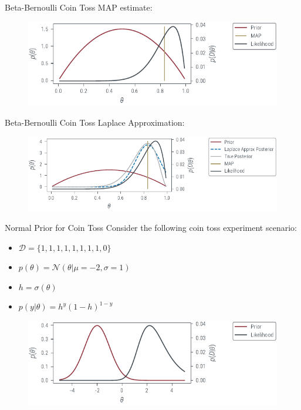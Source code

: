 \documentclass{beamer}
\begin{document}
\begin{frame}{Beta-Bernoulli Coin Toss}
    MAP estimate:
    \begin{figure}
        \includegraphics[]{../figures/laplace-approx/beta-prior-coin-toss-map.pdf}
    \end{figure}
\end{frame}

\begin{frame}{Beta-Bernoulli Coin Toss}
    Laplace Approximation:
    \begin{figure}
        \includegraphics[]{../figures/laplace-approx/beta-prior-coin-toss-laplace.pdf}
    \end{figure}
\end{frame}

\begin{frame}{Normal Prior for Coin Toss}
    Consider the following coin toss experiment scenario:
    \begin{itemize}
        \item $\mathcal{D} = \{1, 1, 1, 1, 1, 1, 1, 1, 0\}$
        \item $p(\theta) = \mathcal{N}(\theta|\mu=-2, \sigma=1)$
        \item $h = \sigma(\theta)$
        \item $p(y|\theta) = h^y(1-h)^{1-y}$
    \end{itemize}
    \begin{figure}
        \includegraphics[]{../figures/laplace-approx/normal-prior-coin-toss.pdf}
    \end{figure}
\end{frame}
\end{document}
